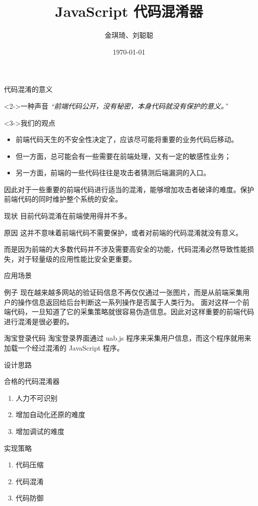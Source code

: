 \documentclass[presentation]{beamer}
\author{金琪琦、刘聪聪}
\date{\today}
\title{JavaScript 代码混淆器}
\begin{document}
\maketitle

\begin{frame}[label=sec-1]{代码混淆的意义}
\begin{block}<2->{一种声音}
\emph{“前端代码公开，没有秘密，本身代码就没有保护的意义。”}
\end{block}
\begin{block}<3->{我们的观点}
\begin{itemize}
\item 前端代码天生的不安全性决定了，应该尽可能将重要的业务代码后移动。
\item 但一方面，总可能会有一些需要在前端处理，又有一定的敏感性业务；
\item 另一方面，前端的一些代码往往是攻击者猜测后端漏洞的入口。
\end{itemize}

因此对于一些重要的前端代码进行适当的混淆，能够增加攻击者破译的难度。保护前端代码的同时维护整个系统的安全。
\end{block}
\end{frame}
\begin{frame}[label=sec-2]{现状}
目前代码混淆在前端使用得并不多。
\begin{block}{原因}
这并不意味着前端代码不需要保护，或者对前端的代码混淆就没有意义。

而是因为前端的大多数代码并不涉及需要高安全的功能，代码混淆必然导致性能损失，对于轻量级的应用性能比安全更重要。
\end{block}
\end{frame}
\begin{frame}[label=sec-3]{应用场景}
\begin{block}{例子}
现在越来越多网站的验证码信息不再仅仅通过一张图片，而是从前端采集用户的操作信息返回给后台判断这一系列操作是否属于人类行为。
面对这样一个前端代码，一旦知道了它的采集策略就很容易伪造信息。因此对这样重要的前端代码进行混淆是很必要的。
\end{block}
\begin{block}{淘宝登录代码}
淘宝登录界面通过 uab.js 程序来采集用户信息，而这个程序就用来加载一个经过混淆的 JavaScript 程序。
\end{block}
\end{frame}
\begin{frame}[label=sec-4]{设计思路}
\begin{block}{合格的代码混淆器}
\begin{enumerate}
\item 人力不可识别
\item 增加自动化还原的难度
\item 增加调试的难度
\end{enumerate}
\end{block}
\begin{block}{实现策略}
\begin{enumerate}
\item 代码压缩
\item 代码混淆
\item 代码防御
\end{enumerate}
\end{block}
\end{frame}
\end{document}
